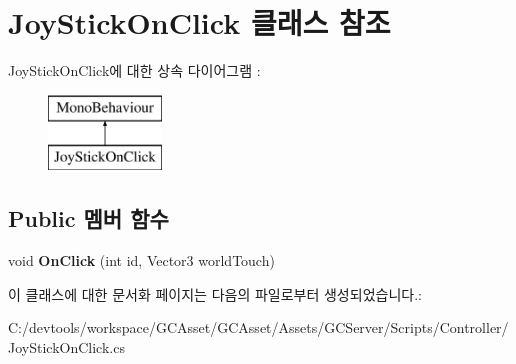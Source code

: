 \hypertarget{class_joy_stick_on_click}{}\section{Joy\+Stick\+On\+Click 클래스 참조}
\label{class_joy_stick_on_click}
Joy\+Stick\+On\+Click에 대한 상속 다이어그램 \+: \begin{figure}[H]
\begin{center}
\leavevmode
\includegraphics[height=2.000000cm]{class_joy_stick_on_click}
\end{center}
\end{figure}
\subsection*{Public 멤버 함수}
\begin{DoxyCompactItemize}
\item 
\hypertarget{class_joy_stick_on_click_a14af1b129ec4e6e0ed51d50a482cfa56}{}void {\bfseries On\+Click} (int id, Vector3 world\+Touch)\label{class_joy_stick_on_click_a14af1b129ec4e6e0ed51d50a482cfa56}

\end{DoxyCompactItemize}


이 클래스에 대한 문서화 페이지는 다음의 파일로부터 생성되었습니다.\+:\begin{DoxyCompactItemize}
\item 
C\+:/devtools/workspace/\+G\+C\+Asset/\+G\+C\+Asset/\+Assets/\+G\+C\+Server/\+Scripts/\+Controller/Joy\+Stick\+On\+Click.\+cs\end{DoxyCompactItemize}
